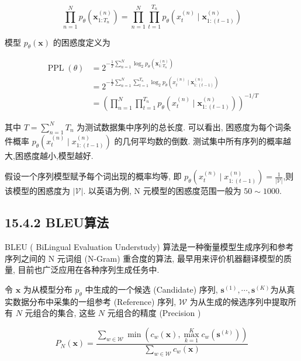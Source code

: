 \documentclass[10pt]{article}
\begin{document}
\begin{equation*}
\prod_{n=1}^{N} p_{\theta}\left(\boldsymbol{x}_{1: T_{n}}^{(n)}\right)=\prod_{n=1}^{N} \prod_{t=1}^{T_{n}} p_{\theta}\left(x_{t}^{(n)} \mid \boldsymbol{x}_{1:(t-1)}^{(n)}\right) \tag{15.35}
\end{equation*}


模型 $p_{\theta}(\boldsymbol{x})$ 的困惑度定义为


\begin{align*}
\operatorname{PPL}(\theta) & =2^{-\frac{1}{T} \sum_{n=1}^{N} \log _{2} p_{\theta}\left(\boldsymbol{x}_{1: T_{n}}^{(n)}\right)}  \tag{15.36}\\
& =2^{-\frac{1}{T} \sum_{n=1}^{N} \sum_{t=1}^{T_{n}} \log _{2} p_{\theta}\left(x_{t}^{(n)} \mid \boldsymbol{x}_{1:(t-1)}^{(n)}\right)}  \tag{15.37}\\
& =\left(\prod_{n=1}^{N} \prod_{t=1}^{T_{n}} p_{\theta}\left(x_{t}^{(n)} \mid \boldsymbol{x}_{1:(t-1)}^{(n)}\right)\right)^{-1 / T} \tag{15.38}
\end{align*}


其中 $T=\sum_{n=1}^{N} T_{n}$ 为测试数据集中序列的总长度. 可以看出, 困惑度为每个词条件概率 $p_{\theta}\left(x_{t}^{(n)} \mid x_{1:(t-1)}^{(n)}\right)$ 的几何平均数的倒数. 测试集中所有序列的概率越大,困惑度越小,模型越好.

假设一个序列模型赋予每个词出现的概率均等, 即 $p_{\theta}\left(x_{t}^{(n)} \mid x_{1:(t-1)}^{(n)}\right)=\frac{1}{|\mathcal{V}|}$,则该模型的困惑度为 $|\mathcal{V}|$. 以英语为例, $\mathrm{N}$ 元模型的困惑度范围一般为 $50 \sim 1000$.

\subsection*{15.4.2 BLEU算法}
BLEU ( BiLingual Evaluation Understudy) 算法是一种衡量模型生成序列和参考序列之间的 $\mathrm{N}$ 元词组 (N-Gram) 重合度的算法, 最早用来评价机器翻译模型的质量, 目前也广泛应用在各种序列生成任务中.

令 $\boldsymbol{x}$ 为从模型分布 $p_{\theta}$ 中生成的一个候选 (Candidate) 序列, $\boldsymbol{s}^{(1)}, \cdots, \boldsymbol{s}^{(K)}$为从真实数据分布中采集的一组参考 (Reference) 序列, $\mathcal{W}$ 为从生成的候选序列中提取所有 $N$ 元组合的集合, 这些 $N$ 元组合的精度 (Precision )


\begin{equation*}
P_{N}(\boldsymbol{x})=\frac{\sum_{w \in \mathcal{W}} \min \left(c_{w}(\boldsymbol{x}), \max _{k=1}^{K} c_{w}\left(\boldsymbol{s}^{(k)}\right)\right)}{\sum_{w \in \mathcal{W}} c_{w}(\boldsymbol{x})} \tag{15.39}
\end{equation*}
\end{document}
